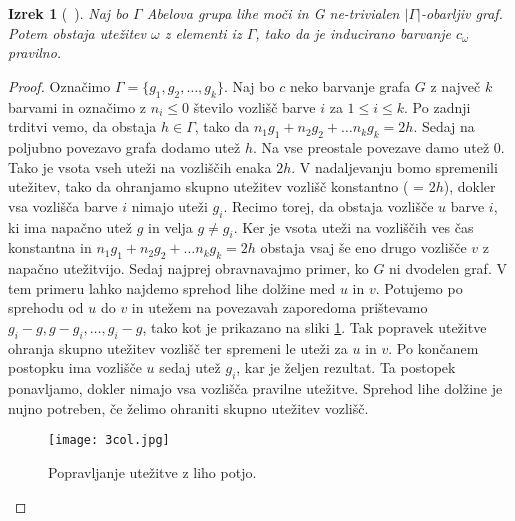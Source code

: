\documentclass[12pt,a4paper,twoside]{article}
\theoremstyle{definition} %
\theoremstyle{plain} %
\newtheorem{izrek}[definicija]{Izrek}
\numberwithin{equation}{section}  %
\begin{document}
  \begin{izrek}[~\citet{base}]
  	Naj bo $\Gamma$ Abelova grupa lihe moči in G ne-trivialen $|\Gamma|$-obarljiv graf. Potem obstaja utežitev $\omega$ z elementi iz $\Gamma$, tako da je inducirano barvanje $c_{\omega}$ pravilno.
  \end{izrek}

\begin{proof}
	Označimo $\Gamma = \{g_1, g_2, \ldots, g_k\}$. Naj bo $c$ neko barvanje grafa $G$ z največ $k$ barvami in označimo z $n_i \le 0$ število vozlišč barve $i$ za $1 \le i \le k$. Po zadnji trditvi vemo, da obstaja $h \in \Gamma$, tako da $n_1g_1 + n_2g_2 + \ldots n_kg_k = 2h$. Sedaj na poljubno povezavo grafa dodamo utež $h$. Na vse preostale povezave damo utež $0$. Tako je vsota vseh uteži na vozliščih enaka $2h$. V nadaljevanju bomo spremenili utežitev, tako da ohranjamo skupno utežitev vozlišč konstantno ( = $2h$), dokler vsa vozlišča barve $i$ nimajo uteži $g_i$. Recimo torej, da obstaja vozlišče $u$ barve $i$, ki ima napačno utež $g$ in velja $g \neq g_i$. Ker je vsota uteži na vozliščih ves čas konstantna in $n_1g_1 + n_2g_2 + \ldots n_kg_k = 2h$ obstaja vsaj še eno drugo vozlišče $v$ z napačno utežitvijo. Sedaj najprej obravnavajmo primer, ko $G$ ni dvodelen graf. V tem primeru lahko najdemo sprehod lihe dolžine med $u$ in $v$. Potujemo po sprehodu od $u$ do $v$ in utežem na povezavah zaporedoma prištevamo $g_i - g, g - g_i, \ldots, g_i - g$, tako kot je prikazano na sliki \ref{im1}. Tak popravek utežitve ohranja skupno utežitev vozlišč ter spremeni le uteži za $u$ in $v$. Po končanem postopku ima vozlišče $u$ sedaj utež $g_i$, kar je željen rezultat. Ta postopek ponavljamo, dokler nimajo vsa vozlišča pravilne utežitve. Sprehod lihe dolžine je nujno potreben, če želimo ohraniti skupno utežitev vozlišč.
 \begin{figure}[h!]
\caption{Popravljanje utežitve z liho potjo.}
\label{im1}
\centering
    \texttt{[image: 3col.jpg]}
    \end{figure}
	

\end{proof}
\end{document}
